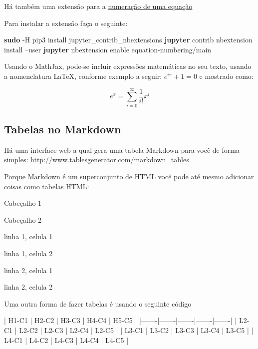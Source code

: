 \documentclass[11pt]{article}
\newenvironment{Shaded}{}{}
\newcommand{\KeywordTok}[1]{\textcolor[rgb]{0.00,0.44,0.13}{\textbf{{#1}}}}
\newcommand{\NormalTok}[1]{{#1}}
\begin{document}
    
    Há também uma extensão para a
\href{https://github.com/ipython-contrib/jupyter_contrib_nbextensions}{numeração
de uma equação}

Para instalar a extensão faça o seguinte:

\begin{Shaded}
\begin{Highlighting}[]
\KeywordTok{sudo} \NormalTok{-H pip3 install jupyter_contrib_nbextensions}
\KeywordTok{jupyter} \NormalTok{contrib nbextension install --user}
\KeywordTok{jupyter} \NormalTok{nbextension enable equation-numbering/main}
\end{Highlighting}
\end{Shaded}

    Usando o MathJax, pode-se incluir expressões matemáticas no seu texto,
usando a nomenclatura LaTeX, conforme exemplo a seguir:
\(e^{i\pi} + 1 = 0\) e mostrado como:

\[e^x=\sum_{i=0}^\infty \frac{1}{i!}x^i\]

    \subsection{Tabelas no Markdown}\label{tabelas-no-markdown}

Há uma interface web a qual gera uma tabela Markdown para você de forma
simples: \url{http://www.tablesgenerator.com/markdown_tables}

Porque Markdown é um superconjunto de HTML você pode até mesmo adicionar
coisas como tabelas HTML:

Cabeçalho 1

Cabeçalho 2

linha 1, celula 1

linha 1, celula 2

linha 2, celula 1

linha 2, celula 2

Uma outra forma de fazer tabelas é usando o seguinte código

\begin{Shaded}
\begin{Highlighting}[]
\NormalTok{| H1-C1 | H2-C2 | H3-C3 | H4-C4 | H5-C5 |}
\NormalTok{|-------|-------|-------|-------|-------|}
\NormalTok{| L2-C1 | L2-C2 | L2-C3 | L2-C4 | L2-C5 |}
\NormalTok{| L3-C1 | L3-C2 | L3-C3 | L3-C4 | L3-C5 |}
\NormalTok{| L4-C1 | L4-C2 | L4-C3 | L4-C4 | L4-C5 |}
\end{Highlighting}
\end{Shaded}
\end{document}
